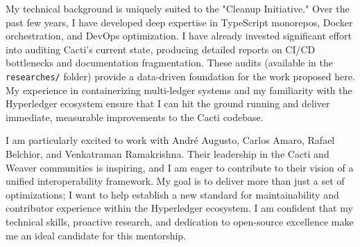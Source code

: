 My technical background is uniquely suited to the "Cleanup Initiative." Over the past few years, I have developed deep expertise in TypeScript monorepos, Docker orchestration, and DevOps optimization. I have already invested significant effort into auditing Cacti’s current state, producing detailed reports on CI/CD bottlenecks and documentation fragmentation. These audits (available in the \texttt{researches/} folder) provide a data-driven foundation for the work proposed here. My experience in containerizing multi-ledger systems and my familiarity with the Hyperledger ecosystem ensure that I can hit the ground running and deliver immediate, measurable improvements to the Cacti codebase.

I am particularly excited to work with André Augusto, Carlos Amaro, Rafael Belchior, and Venkatraman Ramakrishna. Their leadership in the Cacti and Weaver communities is inspiring, and I am eager to contribute to their vision of a unified interoperability framework. My goal is to deliver more than just a set of optimizations; I want to help establish a new standard for maintainability and contributor experience within the Hyperledger ecosystem. I am confident that my technical skills, proactive research, and dedication to open-source excellence make me an ideal candidate for this mentorship.

